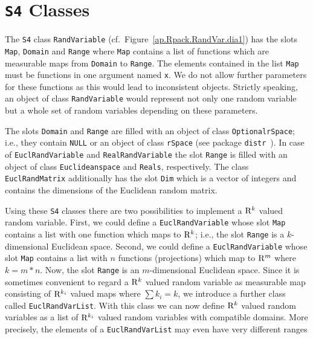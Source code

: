 \documentclass[11pt]{article}
\begin{document}
\section{{\tt S4} Classes}
The {\tt S4} class {\tt RandVariable} (cf.\ Figure~\ref{ap.Rpack.RandVar.dia1})
has the slots {\tt Map}, {\tt Domain} and {\tt Range} where {\tt Map}
contains a list of functions which are measurable maps from {\tt Domain}
to {\tt Range}. The elements contained in the list {\tt Map} must be functions in 
one argument named {\tt x}. We do not allow further parameters for these 
functions as this would lead to inconsistent objects. Strictly speaking, an object of 
class {\tt RandVariable} would represent not only one random variable but a whole 
set of random variables depending on these parameters.
\par
The slots {\tt Domain} and {\tt Range} are filled with an object of
class {\tt OptionalrSpace}; i.e., they contain {\tt NULL} or an object of class 
{\tt rSpace} (see package {\tt distr}~\cite{distr}). In case of
{\tt EuclRandVariable} and {\tt RealRandVariable} the slot {\tt Range} is filled 
with an object of class {\tt Euclideanspace} and {\tt Reals}, respectively. The 
class {\tt EuclRandMatrix} additionally has the slot {\tt Dim} which is a vector 
of integers and contains the dimensions of the Euclidean random matrix.
\par
Using these {\tt S4} classes there are two possibilities to implement a ${\rm R}^k$
valued random variable. First, we could define a {\tt EuclRandVariable}
whose slot {\tt Map} contains a list with one function which maps to ${\rm R}^k$;
i.e., the slot {\tt Range} is a $k$-dimensional Euclidean space. Second, we could
define a {\tt EuclRandVariable} whose slot {\tt Map} contains a list with $n$
functions (projections) which map to ${\rm R}^m$ where $k = m*n$. Now, the slot
{\tt Range} is an $m$-dimensional Euclidean space.
Since it is sometimes convenient to regard a ${\rm R}^k$ valued random variable
as measurable map consisting of ${\rm R}^{k_i}$ valued maps where $\sum k_i = k$,
we introduce a further class called {\tt EuclRandVarList}.
With this class we can now define ${\rm R}^k$ valued random variables as a list
of ${\rm R}^{k_i}$ valued random variables with compatible domains. More precisely,
the elements of a {\tt EuclRandVarList} may even have very different ranges
\end{document}
